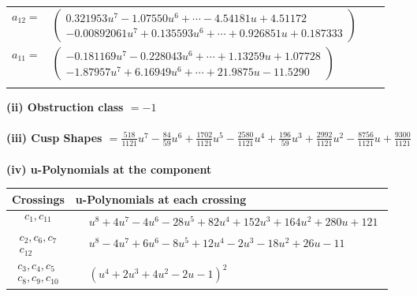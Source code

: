 \documentclass[1p]{elsarticle_modified}
\theoremstyle{definition}
\begin{document}
\begin{tabular}{m{7pt} m{180pt} m{7pt} m{180pt} }
\flushright $a_{12}=$&$\begin{pmatrix}0.321953 u^{7}-1.07550 u^{6}+\cdots-4.54181 u+4.51172\\-0.00892061 u^{7}+0.135593 u^{6}+\cdots+0.926851 u+0.187333\end{pmatrix}$ \\
\flushright $a_{11}=$&$\begin{pmatrix}-0.181169 u^{7}-0.228043 u^{6}+\cdots+1.13259 u+1.07728\\-1.87957 u^{7}+6.16949 u^{6}+\cdots+21.9875 u-11.5290\end{pmatrix}$\\&\end{tabular}
\flushleft \textbf{(ii) Obstruction class $= -1$}\\~\\
\flushleft \textbf{(iii) Cusp Shapes $= \frac{518}{1121} u^7-\frac{84}{59} u^6+\frac{1702}{1121} u^5-\frac{2580}{1121} u^4+\frac{196}{59} u^3+\frac{2992}{1121} u^2-\frac{8756}{1121} u+\frac{9300}{1121}$}\\~\\
\newpage\renewcommand{\arraystretch}{1}
\flushleft \textbf{(iv) u-Polynomials at the component}\newline \\
\begin{tabular}{m{50pt}|m{274pt}}
Crossings & \hspace{64pt}u-Polynomials at each crossing \\
\hline $$\begin{aligned}c_{1},c_{11}\end{aligned}$$&$\begin{aligned}
&u^8+4 u^7-4 u^6-28 u^5+82 u^4+152 u^3+164 u^2+280 u+121
\end{aligned}$\\
\hline $$\begin{aligned}c_{2},c_{6},c_{7}\\c_{12}\end{aligned}$$&$\begin{aligned}
&u^8-4 u^7+6 u^6-8 u^5+12 u^4-2 u^3-18 u^2+26 u-11
\end{aligned}$\\
\hline $$\begin{aligned}c_{3},c_{4},c_{5}\\c_{8},c_{9},c_{10}\end{aligned}$$&$\begin{aligned}
&(u^4+2 u^3+4 u^2-2 u-1)^2
\end{aligned}$\\
\hline
\end{tabular}\\~\\
\end{document}
